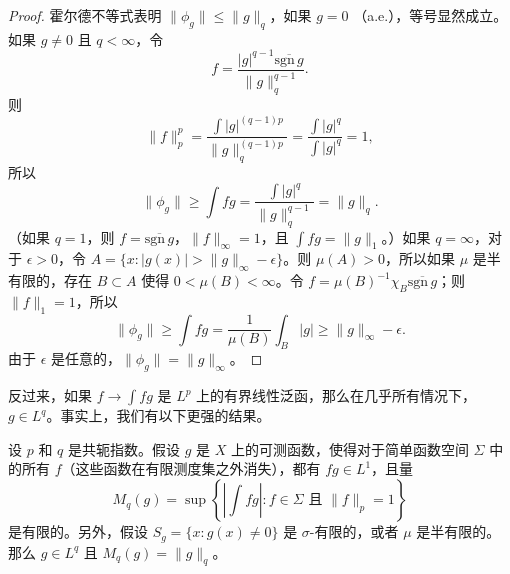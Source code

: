 \documentclass[lang=cn,10pt,thmcnt=section]{elegantbook}
\begin{document}
\begin{proof}
霍尔德不等式表明 $\|\phi_g\| \leq \|g\|_q$，如果 $g = 0$ （a.e.），等号显然成立。如果 $g \neq 0$ 且 $q < \infty$，令
\[ f = \frac{|g|^{q-1}\overline{\text{sgn}\,g}}{\|g\|_q^{q-1}}. \]
则
\[ \|f\|_p^p = \frac{\int |g|^{(q-1)p}}{\|g\|_q^{(q-1)p}} = \frac{\int |g|^q}{\int |g|^q} = 1, \]
所以
\[ \|\phi_g\| \geq \int fg = \frac{\int |g|^q}{\|g\|_q^{q-1}} = \|g\|_q. \]
（如果 $q=1$，则 $f = \overline{\text{sgn}\,g}$，$\|f\|_\infty = 1$，且 $\int fg = \|g\|_1$。）如果 $q = \infty$，对于 $\epsilon > 0$，令 $A = \{x : |g(x)| > \|g\|_\infty - \epsilon\}$。则 $\mu(A) > 0$，所以如果 $\mu$ 是半有限的，存在 $B \subset A$ 使得 $0 < \mu(B) < \infty$。令 $f = \mu(B)^{-1}\chi_B\overline{\text{sgn}\,g}$；则 $\|f\|_1 = 1$，所以
\[ \|\phi_g\| \geq \int fg = \frac{1}{\mu(B)}\int_B |g| \geq \|g\|_\infty - \epsilon. \]
由于 $\epsilon$ 是任意的，$\|\phi_g\| = \|g\|_\infty$。
\end{proof}

反过来，如果 $f \to \int fg$ 是 $L^p$ 上的有界线性泛函，那么在几乎所有情况下，$g \in L^q$。事实上，我们有以下更强的结果。

\begin{theorem}\label{theorem6.14}
设 $p$ 和 $q$ 是共轭指数。假设 $g$ 是 $X$ 上的可测函数，使得对于简单函数空间 $\Sigma$ 中的所有 $f$（这些函数在有限测度集之外消失），都有 $fg \in L^1$，且量
\[ M_q(g) = \sup\left\{\left|\int fg\right| : f \in \Sigma \text{ 且 } \|f\|_p = 1\right\} \]
是有限的。另外，假设 $S_g = \{x : g(x) \neq 0\}$ 是 $\sigma$-有限的，或者 $\mu$ 是半有限的。那么 $g \in L^q$ 且 $M_q(g) = \|g\|_q$。
\end{theorem}
\end{document}
